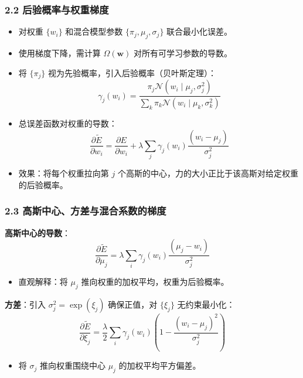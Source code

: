 \documentclass[t,aspectratio=169]{beamer} %
\begin{document}
\begin{frame}
    \frametitle{2.2 后验概率与权重梯度}
    \begin{itemize}
        \item 对权重 $\{w_i\}$ 和混合模型参数 $\{\pi_j, \mu_j, \sigma_j\}$ \alert{联合最小化}误差。
        \item 使用梯度下降，需计算 $\Omega(\mathbf{w})$ 对所有可学习参数的导数。
        \item 将 $\{\pi_j\}$ 视为\alert{先验概率}，引入\alert{后验概率}（贝叶斯定理）：
        \begin{equation}
            \gamma_j(w_i) = \frac{\pi_j \mathcal{N}(w_i \mid \mu_j, \sigma_j^2)}{\sum_k \pi_k \mathcal{N}(w_i \mid \mu_k, \sigma_k^2)}
            \tag{9.24}
        \end{equation}
        \item 总误差函数对权重的导数：
        \begin{equation}
            \frac{\partial \widetilde{E}}{\partial w_i} = \frac{\partial E}{\partial w_i} + \lambda \sum_j \gamma_j(w_i) \frac{(w_i - \mu_j)}{\sigma_j^2}
            \tag{9.25}
        \end{equation}
        \item 效果：将每个权重\alert{拉向第 $j$ 个高斯的中心}，力的大小正比于该高斯对给定权重的后验概率。
    \end{itemize}
\end{frame}

\begin{frame}
    \frametitle{2.3 高斯中心、方差与混合系数的梯度}
    \textbf{高斯中心的导数}：
    \begin{equation}
        \frac{\partial \widetilde{E}}{\partial \mu_j} = \lambda \sum_i \gamma_j(w_i) \frac{(\mu_j - w_i)}{\sigma_j^2}
        \tag{9.26}
    \end{equation}
    \begin{itemize}
        \item 直观解释：将 $\mu_j$ 推向权重的\alert{加权平均}，权重为后验概率。
    \end{itemize}
    \textbf{方差}：引入 $\sigma_j^2 = \exp(\xi_j)$ 确保正值，对 $\{\xi_j\}$ 无约束最小化：
    \begin{equation}
        \frac{\partial \widetilde{E}}{\partial \xi_j} = \frac{\lambda}{2} \sum_i \gamma_j(w_i) \left( 1 - \frac{(w_i - \mu_j)^2}{\sigma_j^2} \right)
        \tag{9.28}
    \end{equation}
    \begin{itemize}
        \item 将 $\sigma_j$ 推向权重围绕中心 $\mu_j$ 的\alert{加权平均平方偏差}。
    \end{itemize}
\end{frame}
\end{document}
